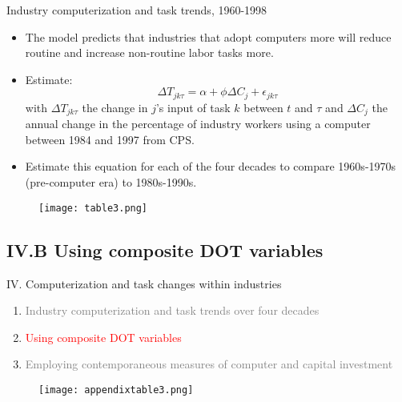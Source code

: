\documentclass[notes=show]{beamer}
\begin{document}
\begin{frame}{Industry computerization and task trends, 1960-1998}
\begin{itemize}
\item The model predicts that industries that adopt computers more will reduce routine and increase non-routine labor tasks more.\medskip
\item Estimate:
\[
\Delta T_{jk \tau} = \alpha + \phi \Delta C_{j} + \epsilon_{jk \tau} \tag{13} \label{eq13}
\]
with $ \Delta T_{jk \tau} $ the change in $j$'s input of task $k$ between $t$ and $ \tau $ and $ \Delta C_{j} $ the annual change in the percentage of industry workers using a computer between 1984 and 1997 from CPS. \medskip
\item Estimate this equation for each of the four decades to compare 1960s-1970s (pre-computer era) to 1980s-1990s.
\end{itemize}
\end{frame}

\newpage
\begin{center}
\begin{figure}
\texttt{[image: table3.png]}
\end{figure} 
\end{center}
\newpage

\subsection{IV.B Using composite DOT variables}

\begin{frame}{IV. Computerization and task changes within industries}
\begin{enumerate}
\item[\textcolor{gray}{IV.A}] \textcolor{gray}{Industry computerization and task trends over four decades} \bigskip
\item[\textcolor{red}{IV.B}] \textcolor{red}{Using composite DOT variables} \bigskip
\item[\textcolor{gray}{IV.C}] \textcolor{gray}{Employing contemporaneous measures of computer and capital investment}
\end{enumerate}
\end{frame}

\newpage
\begin{center}
\begin{figure}
\texttt{[image: appendixtable3.png]}
\end{figure} 
\end{center}
\newpage
\end{document}
